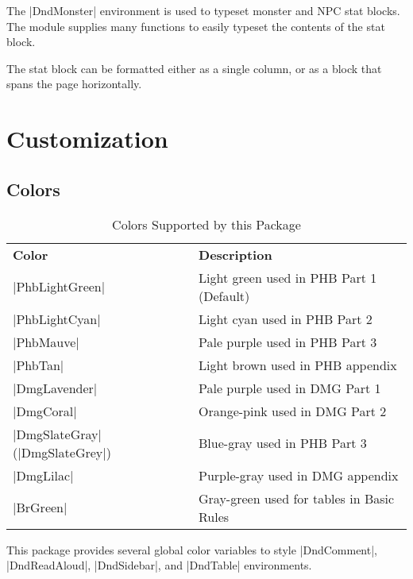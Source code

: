 \documentclass[letterpaper,twocolumn,openany,nodeprecatedcode]{dndbook}
\begin{document}
The |DndMonster| environment is used to typeset monster and NPC stat blocks. The module supplies many functions to easily typeset the contents of the stat block.

The stat block can be formatted either as a single column, or as a block that spans the page horizontally.

\part{Customization}

\chapter{Colors}

\begin{table*}[b]
  \caption{\DndFontTableTitle{}Colors Supported by this Package}\label{tab:colors}

  \begin{tabularx}{\linewidth}{lX}
    \textbf{Color}                  & \textbf{Description} \\
    \rowcolor{PhbLightGreen}
    |PhbLightGreen|                 & Light green used in PHB Part 1 (Default) \\
    \rowcolor{PhbLightCyan}
    |PhbLightCyan|                  & Light cyan used in PHB Part 2 \\
    \rowcolor{PhbMauve}
    |PhbMauve|                      & Pale purple used in PHB Part 3 \\
    \rowcolor{PhbTan}
    |PhbTan|                        & Light brown used in PHB appendix \\
    \rowcolor{DmgLavender}
    |DmgLavender|                   & Pale purple used in DMG Part 1 \\
    \rowcolor{DmgCoral}
    |DmgCoral|                      & Orange-pink used in DMG Part 2 \\
    \rowcolor{DmgSlateGray}
    |DmgSlateGray| (|DmgSlateGrey|) & Blue-gray used in PHB Part 3 \\
    \rowcolor{DmgLilac}
    |DmgLilac|                      & Purple-gray used in DMG appendix \\
    \rowcolor{BrGreen}
    |BrGreen|                       & Gray-green used for tables in Basic Rules\\
  \end{tabularx}
\end{table*}

This package provides several global color variables to style |DndComment|, |DndReadAloud|, |DndSidebar|, and |DndTable| environments.
\end{document}
